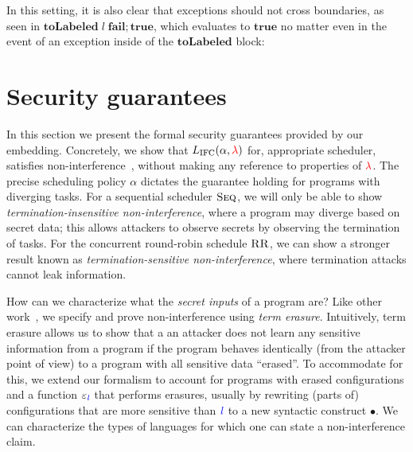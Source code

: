 \documentclass{sigplanconf}
\newcommand{\Varid}[1]{\mathit{#1}}
\newcommand{\Red}[1]{{\color{red} #1}}
\begin{document}
In this setting, it is also clear that exceptions should not cross boundaries,
as seen in \ensuremath{\mathbf{toLabeled}\;\Varid{l}\;\mathbf{fail};\mathbf{true}}, which evaluates to \ensuremath{\mathbf{true}} no matter even in
the event of an exception inside of the \ensuremath{\mathbf{toLabeled}} block:







\section{Security guarantees}
\label{sec:formal}

In this section we present the formal security guarantees provided by
our embedding.
%
Concretely, we show that \ensuremath{L_\text{IFC}(\alpha,\Red{\lambda})} for, appropriate
scheduler, satisfies non-interference~\cite{Goguen82},
without making any reference to properties of \ensuremath{\Red{\lambda}}.
%
The precise scheduling policy \ensuremath{\alpha} dictates
the guarantee holding for programs with diverging tasks.
For a sequential scheduler \ensuremath{\textsc{Seq}}, we will only be able to show
\emph{termination-insensitive non-interference}, where a program
may diverge based on secret data; this allows attackers to observe
secrets by observing the termination of tasks.
For the concurrent round-robin schedule \ensuremath{\textsc{RR}},
we can show a stronger result known as
\emph{termination-sensitive non-interference},
where termination attacks cannot leak information.

How can we characterize what the \emph{secret inputs} of a program are?  Like
other work~\cite{Li+:2010:arrows,Russo+:Haskell08,lio,stefan:addressing-covert},
we specify and prove non-interference using \emph{term erasure}.
%
Intuitively, term erasure allows us to show that a an attacker does not learn
any sensitive information from a program if the program behaves identically
(from the attacker point of view) to a program with all sensitive data
``erased''.
%
To accommodate for this, we extend our formalism to account for
programs with erased configurations and a function \ensuremath{\varepsilon_{\ifc{\Varid{l}}}} that
performs erasures, usually by rewriting (parts of) configurations that
are more sensitive than \ensuremath{\ifc{\Varid{l}}} to a new syntactic construct \ensuremath{\bullet}.
%
We can characterize the types of languages for which one can state
a non-interference claim.
\end{document}
